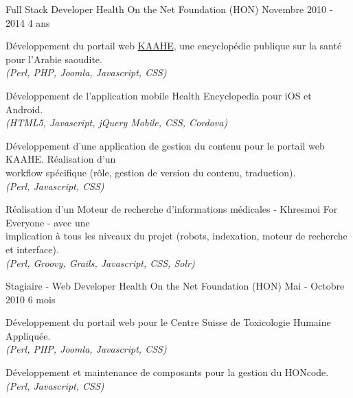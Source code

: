 \begin{cventries}
  \cventry
    {Full Stack Developer}
    {Health On the Net Foundation (HON)}
    {Novembre 2010 - 2014}
    {4 ans}
    {
      \begin{cvitems}
        \item{Développement du portail web
          {\color{awesome-skyblue}\href{https://kaahe.org/}{KAAHE}}, une
          encyclopédie publique sur la santé pour l'Arabie saoudite.\\
          \textit{(Perl, PHP, Joomla, Javascript, CSS)}
        }
        \item{Développement de l'application mobile Health Encyclopedia pour
          iOS et Android.\\
          \textit{(HTML5, Javascript, jQuery Mobile, CSS, Cordova)}
        }
        \item{Développement d'une application de gestion du contenu pour le
          portail web KAAHE. Réalisation d'un \\workflow spécifique (rôle,
          gestion de version du contenu, traduction).\\
          \textit{(Perl, Javascript, CSS)}
        }
        \item{Réalisation d'un Moteur de recherche d'informations médicales -
          Khresmoi For Everyone - avec une \\implication à tous les niveaux
          du projet (robots, indexation, moteur de recherche et interface).\\
          \textit{(Perl, Groovy, Grails, Javascript, CSS, Solr)}
        }
      \end{cvitems}
    }

  \cventry
    {Stagiaire - Web Developer}
    {Health On the Net Foundation (HON)}
    {Mai - Octobre 2010}
    {6 mois}
    {
      \begin{cvitems}
        \item{Développement du portail web pour le Centre Suisse de
          Toxicologie Humaine Appliquée.\\
          \textit{(Perl, PHP, Joomla, Javascript, CSS)}
        }
        \item{Développement et maintenance de composants pour la gestion du
          HONcode.\\
          \textit{(Perl, Javascript, CSS)}
        }
      \end{cvitems}
    }

\end{cventries}
